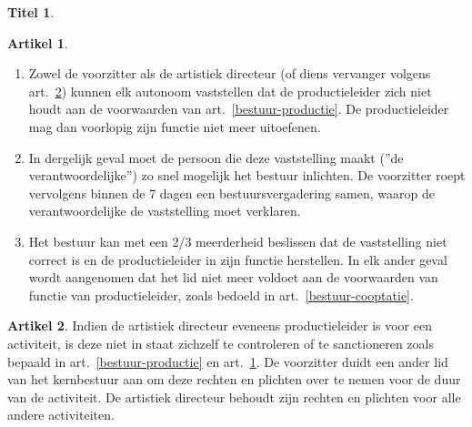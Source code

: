 \documentclass[a4paper,10pt]{article}
\theoremstyle{definition}
\newtheorem{titel}{\newline\Large Titel}
\newtheorem{artikel}{\large Artikel}
\newcommand{\ttextcr}{\hfill\newline}
\newcommand{\ttextenum}{\mbox{}}
\begin{document}
\begin{titel}
  
  \begin{artikel}\label{bestuur-controle}\ttextenum
    \begin{enumerate}
      \item
        Zowel de voorzitter als de artistiek directeur (of diens vervanger volgens art.~\ref{bestuur-vervanging}) kunnen elk autonoom vaststellen dat de productieleider zich niet houdt aan de voorwaarden van art.~\ref{bestuur-productie}.
        De productieleider mag dan voorlopig zijn functie niet meer uitoefenen.
      \item
        In dergelijk geval moet de persoon die deze vaststelling maakt (''de verantwoordelijke'') zo snel mogelijk het bestuur inlichten.
        De voorzitter roept vervolgens binnen de 7 dagen een bestuursvergadering samen, waarop de verantwoordelijke de vaststelling moet verklaren.
      \item
        Het bestuur kan met een 2/3 meerderheid beslissen dat de vaststelling niet correct is en de productieleider in zijn functie herstellen.  
        In elk ander geval wordt aangenomen dat het lid niet meer voldoet aan de voorwaarden van functie van productieleider, zoals bedoeld in art.~\ref{bestuur-cooptatie}.
    \end{enumerate}
  \end{artikel}

  \begin{artikel}\label{bestuur-vervanging}\ttextcr
    Indien de artistiek directeur eveneens productieleider is voor een activiteit, is deze niet in staat zichzelf te controleren of te sanctioneren zoals bepaald in art.~\ref{bestuur-productie} en art.~\ref{bestuur-controle}.
    De voorzitter duidt een ander lid van het kernbestuur aan om deze rechten en plichten over te nemen voor de duur van de activiteit.
    De artistiek directeur behoudt zijn rechten en plichten voor alle andere activiteiten.
  \end{artikel}

\end{titel}
\end{document}

